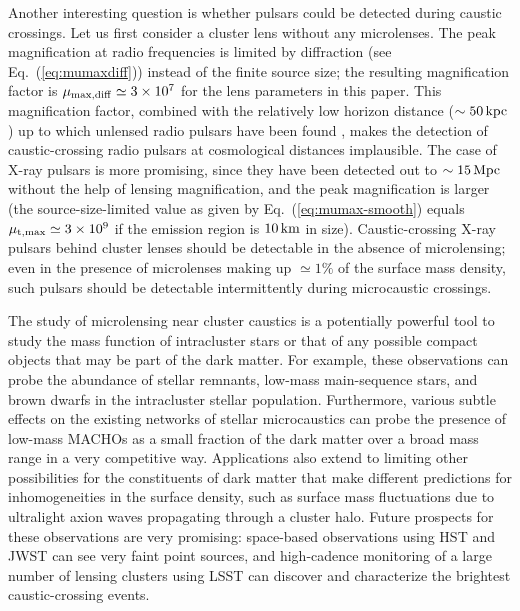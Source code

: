 \documentclass{aastex6}
\newcommand{\refeq}[1]{Eq.~(\ref{eq:#1})}
\begin{document}
Another interesting question is whether pulsars could be detected during caustic crossings. Let us first consider a cluster lens without any microlenses. The peak magnification at radio frequencies is limited by diffraction (see \refeq{mumaxdiff}) instead of the finite source size; the resulting magnification factor is $\mu_{\rm max, diff} \simeq 3 \times 10^7$ for the lens parameters in this paper. This magnification factor, combined with the relatively low horizon distance ($\sim 50\,{\rm kpc}$) up to which unlensed radio pulsars have been found \citep{2005AJ....129.1993M}, makes the detection of caustic-crossing radio pulsars at cosmological distances implausible. The case of X-ray pulsars is more promising, since they have been detected out to $\sim 15\,{\rm Mpc}$ \citep{2017Sci...355..817I} without the help of lensing magnification, and the peak magnification is larger (the source-size-limited value as given by \refeq{mumax-smooth} equals $\mu_{\rm t, max} \simeq 3 \times 10^9$ if the emission region is $10\,{\rm km}$ in size). Caustic-crossing X-ray pulsars behind cluster lenses should be detectable in the absence of microlensing; even in the presence of microlenses making up $\simeq 1\%$ of the surface mass density, such pulsars should be detectable intermittently during microcaustic crossings.

The study of microlensing near cluster caustics is a potentially powerful tool to study the mass function of intracluster stars or that of any possible compact objects that may be part of the dark matter. For example, these observations can probe the abundance of stellar remnants, low-mass main-sequence stars, and brown dwarfs in the intracluster stellar population. Furthermore, various subtle effects on the existing networks of stellar microcaustics can probe the presence of low-mass MACHOs as a small fraction of the dark matter over a broad mass range in a very competitive way. Applications also extend to limiting other possibilities for the constituents of dark matter that make different predictions for inhomogeneities in the surface density, such as surface mass fluctuations due to ultralight axion waves propagating through a cluster halo. Future prospects for these observations are very promising: space-based observations using HST and JWST can see very faint point sources, and high-cadence monitoring of a large number of lensing clusters using LSST can discover and characterize the brightest caustic-crossing events.
\end{document}
